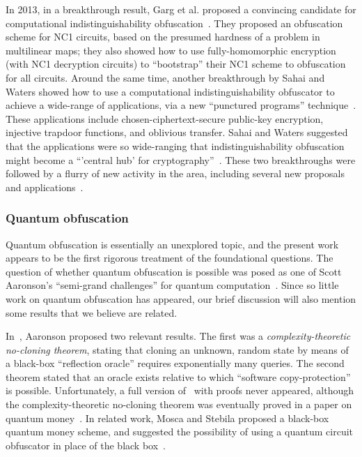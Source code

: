 \documentclass[11pt]{article}
\numberwithin{equation}{section}
\begin{document}
{In 2013, in a breakthrough result, Garg et al. proposed a convincing candidate for computational indistinguishability obfuscation~\cite{GGHRSW13}. They proposed an obfuscation scheme for NC1 circuits, based on the presumed hardness of a problem in multilinear maps; they also showed how to use fully-homomorphic encryption (with NC1 decryption circuits) to ``bootstrap'' their NC1 scheme to obfuscation for all circuits. Around the same time, another breakthrough by Sahai and Waters showed how to use a computational indistinguishability obfuscator to achieve a wide-range of applications, via a new ``punctured programs'' technique~\cite{SW14}. These applications include chosen-ciphertext-secure public-key encryption, injective trapdoor functions, and oblivious transfer. Sahai and Waters suggested that the applications were so wide-ranging that indistinguishability obfuscation might become a ``'central hub' for cryptography''~\cite{SW14}. These two breakthroughs were followed by a flurry of new activity in the area, including several new proposals and applications~\cite{BGKPS14, BCCGKPR14, BZ14, BR14, GGHW14, HSW14}.

\subsubsection{Quantum obfuscation} 

Quantum obfuscation is essentially an unexplored topic, and the present work appears to be the first rigorous treatment of the foundational questions. The question of whether quantum obfuscation is possible was posed as one of Scott Aaronson's ``semi-grand challenges'' for quantum computation~\cite{Aar05}. Since so little work on quantum obfuscation has appeared, our brief discussion will also mention some results that we believe are related. 

In~\cite{Aar09}, Aaronson proposed two relevant results. The first was a \emph{complexity-theoretic no-cloning theorem}, stating that cloning an unknown, random state by means of a black-box ``reflection oracle'' requires exponentially many queries. The second theorem stated that an oracle exists relative to which ``software copy-protection'' is possible. Unfortunately, a full version of~\cite{Aar09} with proofs never appeared, although the complexity-theoretic no-cloning theorem was eventually proved in a paper on quantum money~\cite{AC12}. In related work, Mosca and Stebila proposed a black-box quantum money scheme, and suggested the possibility of using a quantum circuit obfuscator in place of the black box~\cite{MS10}.

}
\end{document}
